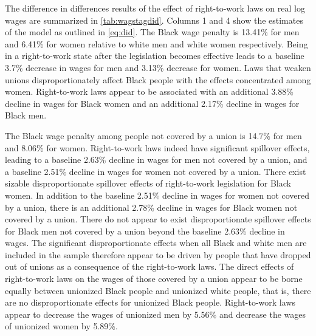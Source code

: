 \documentclass[11pt]{article}
\begin{document}
The difference in differences results of the effect of right-to-work laws on real log wages are summarized in \autoref{tab:wagstagdid}. Columns 1 and 4 show the estimates of the model as outlined in \autoref{eq:did}. The Black wage penalty is 13.41\% for men and 6.41\% for women relative to white men and white women respectively. Being in a right-to-work state after the legislation becomes effective leads to a baseline 3.7\% decrease in wages for men and 3.13\% decrease for women. Laws that weaken unions disproportionately affect Black people with the effects concentrated among women. Right-to-work laws appear to be associated with an additional 3.88\% decline in wages for Black women and an additional 2.17\% decline in wages for Black men. 

The Black wage penalty among people not covered by a union is 14.7\% for men and 8.06\% for women. Right-to-work laws indeed have significant spillover effects, leading to a baseline 2.63\% decline in wages for men not covered by a union, and a baseline 2.51\% decline in wages for women not covered by a union. There exist sizable disproportionate spillover effects of right-to-work legislation for Black women. In addition to the baseline 2.51\% decline in wages for women not covered by a union, there is an additional 2.78\% decline in wages for Black women not covered by a union. There do not appear to exist disproportionate spillover effects for Black men not covered by a union beyond the baseline 2.63\% decline in wages. The significant disproportionate effects when all Black and white men are included in the sample therefore appear to be driven by people that have dropped out of unions as a consequence of the right-to-work laws. The direct effects of right-to-work laws on the wages of those covered by a union appear to be borne equally between unionized Black people and unionized white people, that is, there are no disproportionate effects for unionized Black people. Right-to-work laws appear to decrease the wages of unionized men by 5.56\% and decrease the wages of unionized women by 5.89\%.
\end{document}
